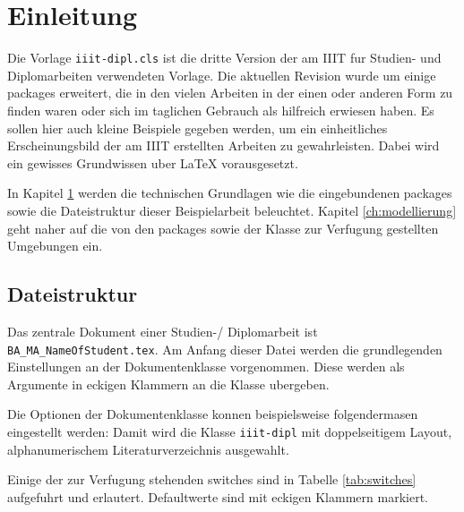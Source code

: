 
\chapter{Einleitung}\label{ch:einleitung} Die Vorlage \lstinline!iiit-dipl.cls! ist die dritte Version der am IIIT fur
Studien- und Diplomarbeiten verwendeten Vorlage. Die aktuellen Revision wurde um einige packages
erweitert, die in den vielen Arbeiten in der einen oder anderen Form zu finden waren oder sich im
taglichen Gebrauch als hilfreich erwiesen haben. Es sollen hier auch kleine Beispiele gegeben
werden, um ein einheitliches Erscheinungsbild der am IIIT erstellten Arbeiten zu gewahrleisten.
Dabei wird ein gewisses Grundwissen uber \LaTeX{} vorausgesetzt.

In Kapitel \ref{ch:einleitung} werden die technischen Grundlagen wie die eingebundenen packages
sowie die Dateistruktur dieser Beispielarbeit beleuchtet. Kapitel \ref{ch:modellierung} geht naher
auf die von den packages sowie der Klasse zur Verfugung gestellten Umgebungen ein.

\section{Dateistruktur}

Das zentrale Dokument einer Studien-/ Diplomarbeit ist \lstinline!BA_MA_NameOfStudent.tex!. Am Anfang dieser
Datei werden die grundlegenden Einstellungen an der Dokumentenklasse vorgenommen. Diese werden als
Argumente in eckigen Klammern an die Klasse ubergeben.

Die Optionen der Dokumentenklasse konnen beispielsweise folgendermasen eingestellt werden:
 Damit wird die Klasse
\lstinline!iiit-dipl! mit doppelseitigem Layout, alphanumerischem
Literaturverzeichnis ausgewahlt.

Einige der zur Verfugung stehenden switches sind in Tabelle \ref{tab:switches} aufgefuhrt und erlautert.
Defaultwerte sind mit eckigen Klammern markiert.


